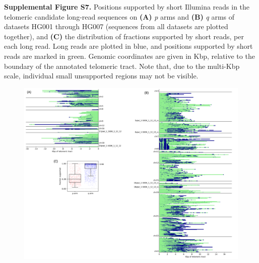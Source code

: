 \documentclass{article}
\begin{document}
\begin{samepage}

\noindent \textbf{Supplemental Figure S7.}
Positions supported by short Illumina reads in the telomeric candidate long-read sequences on \textbf{(A)} \textit{p} arms and \textbf{(B)} \textit{q} arms of datasets HG001 through HG007 (sequences from all datasets are plotted together), and \textbf{(C)} the distribution of fractions supported by short reads, per each long read.
Long reads are plotted in blue, and positions supported by short reads are marked in green.
Genomic coordinates are given in Kbp, relative to the boundary of the annotated telomeric tract.
Note that, due to the multi-Kbp scale, individual small unsupported regions may not be visible.

\begin{figure}[h!] \centering
\includegraphics[width=.84\textwidth,keepaspectratio]{renders/figures/Figure-S7.pdf}
\end{figure}

\end{samepage}
\end{document}
